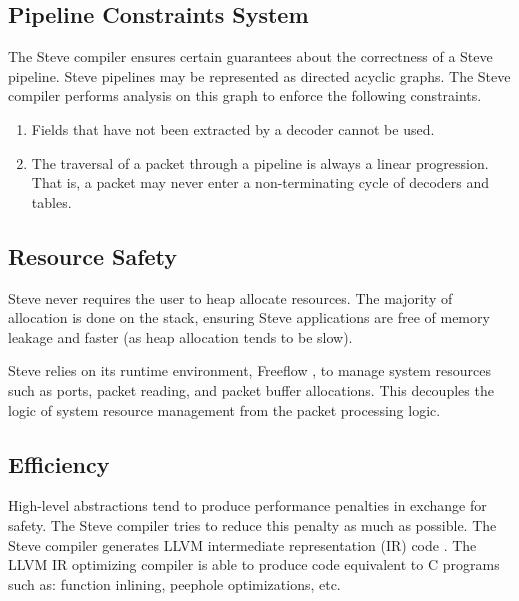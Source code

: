 \subsection{Pipeline Constraints System}

The Steve compiler ensures certain guarantees about the correctness of a Steve
pipeline. Steve pipelines may be represented as directed acyclic graphs. The
Steve compiler performs analysis on this graph to enforce the following
constraints.

\begin{enumerate}
\item Fields that have not been extracted by a decoder cannot be used. 

\item The traversal of a packet through a pipeline is always a linear
progression. That is, a packet may never enter a non-terminating cycle
of decoders and tables.
\end{enumerate}

\subsection{Resource Safety}

Steve never requires the user to heap allocate resources. The majority of
allocation is done on the stack, ensuring Steve applications are free of
memory leakage and faster (as heap allocation tends to be slow).

Steve relies on its runtime environment, Freeflow \cite{freeflow_software}, 
to manage system resources such as
ports, packet reading, and packet buffer allocations.
This decouples the logic of system resource management from the packet
processing logic.

\subsection{Efficiency}


High-level abstractions tend to produce performance penalties in exchange
for safety. The Steve compiler tries to reduce this penalty as much as possible.
The Steve compiler generates LLVM intermediate representation (IR) code
\cite{llvm_webpage}. The LLVM IR optimizing compiler is able to produce 
code equivalent to C programs such as:
function inlining, peephole optimizations, etc.

